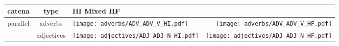 \documentclass{article}
\begin{document}
\begin{table}
  [ht] 
   \begin{tabular}{ c  | c | l   r } \hline 
catena &  type & \multicolumn{2}{l}{\hspace{1cm} HI\hspace{3cm} Mixed\hspace{3cm} HF} \\
       \hline \multirow{2}{*}{parallel} & adverbs & \parbox[c]{14em}{\texttt{[image: adverbs/ADV\_ADV\_V\_HI.pdf]}} & \parbox[c]{14em}{\texttt{[image: adverbs/ADV\_ADV\_V\_HF.pdf]}} \\
    & adjectives & \parbox[c]{14em}{\texttt{[image: adjectives/ADJ\_ADJ\_N\_HI.pdf]}} & \parbox[c]{14em}{\texttt{[image: adjectives/ADJ\_ADJ\_N\_HF.pdf]}} \\
    \hline
  \end{tabular}
\end{table}
\end{document}
